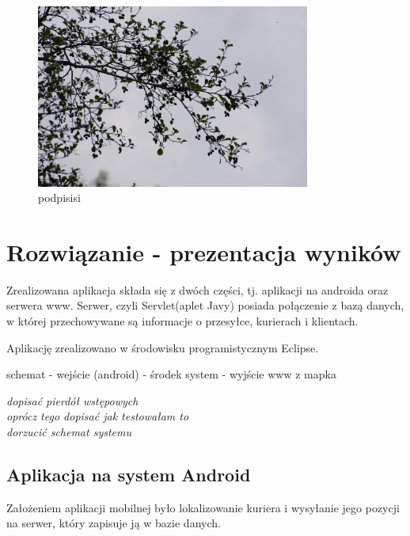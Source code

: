 \documentclass[eng,printmode,oneside]{mgr}
\begin{document}
\begin{figure}[ht!]
\centering
\includegraphics[width=90mm]{obr.jpg}
\caption{podpisisi}
\end{figure}
\chapter{Rozwiązanie - prezentacja wyników}


Zrealizowana aplikacja składa się z dwóch części, tj. aplikacji na androida oraz
serwera www. Serwer, czyli Servlet(aplet Javy) posiada połączenie z bazą
danych, w której przechowywane są informacje o przesyłce, kurierach i
klientach. 

Aplikację zrealizowano w środowisku programistycznym Eclipse.

schemat - wejście (android) - środek system - wyjście www z mapka

\emph{\color{komentarz} dopisać pierdół wstępowych\\oprócz tego dopisać jak
testowałam to\\dorzucić schemat systemu}
\section{Aplikacja na system Android}

Założeniem aplikacji mobilnej było lokalizowanie kuriera i wysyłanie jego
pozycji na serwer, który zapisuje ją w bazie danych. 
\end{document}
